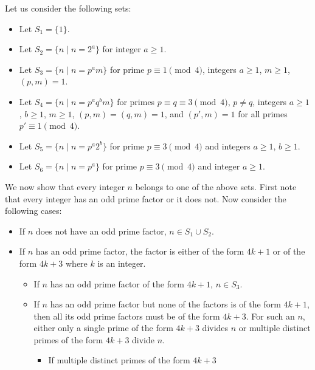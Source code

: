 \begin{solution}
  Let us consider the following sets:
  \begin{itemize}
  \item
    Let \( S_1 = \{ 1 \} \).
  \item
    Let \( S_2 = \{ n \mid n = 2^a \} \) for integer \( a \ge 1 \).
  \item
    Let \( S_3 = \{ n \mid n = p^a m \} \) for prime \( p \equiv 1
    \pmod{4} \), integers \( a \ge 1 \), \( m \ge 1 \), \( (p, m) = 1
    \).
  \item
    Let \( S_4 = \{ n \mid n = p^a q^b m \} \) for primes \( p \equiv
    q \equiv 3 \pmod{4} \), \( p \neq q \), integers \( a \ge 1 \), \(
    b \ge 1 \), \( m \ge 1 \), \( (p, m) = (q, m) = 1 \), and \( (p',
    m) = 1 \) for all primes \( p' \equiv 1 \pmod{4} \).
  \item
    Let \( S_5 = \{ n \mid n = p^a 2^b \} \)
    for prime \( p \equiv 3 \pmod{4} \) and integers \( a \ge 1 \), \( b \ge 1 \).
  \item
    Let \( S_6 = \{ n \mid n = p^a \} \)
    for prime \( p \equiv 3 \pmod{4} \) and integer \( a \ge 1 \).
  \end{itemize}
  We now show that every integer \( n \) belongs to one of the above
  sets. First note that every integer has an odd prime factor or it
  does not. Now consider the following cases:
  \begin{itemize}
    \item
      If \( n \) does not have an odd prime factor, \( n \in S_1 \cup
      S_2 \).
    \item
      If \( n \) has an odd prime factor, the factor is either of the
      form \( 4k + 1 \) or of the form \( 4k + 3 \) where \( k \) is
      an integer.
      \begin{itemize}
      \item
        If \( n \) has an odd prime factor of the form \( 4k + 1 \),
        \( n \in S_3 \).
      \item
          If \( n \) has an odd prime factor but none of the factors
          is of the form \( 4k + 1 \), then all its odd prime factors
          must be of the form \( 4k + 3 \). For such an \( n \),
          either only a single prime of the form \( 4k + 3 \) divides
          \( n \) or multiple distinct primes of the form \( 4k + 3 \)
          divide \( n \).
          \begin{itemize}
          \item
            If multiple distinct primes of the form \( 4k + 3 \)

\end{itemize}
\end{itemize}
\end{itemize}
\end{solution}
